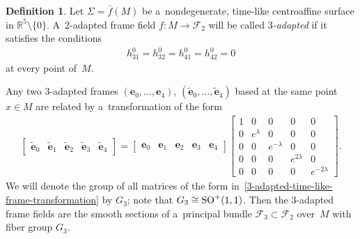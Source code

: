 \documentclass[pdftex]{sigma}
\numberwithin{equation}{section}
\theoremstyle{definition}
\newtheorem{dfn}[teo]{Definition}
\begin{document}
\begin{dfn}
Let $\Sigma = \bar{f}(M)$ be a~nondegenerate, time-like centroaf\/f\/ine surface in $\mathbb{R}^5 \setminus \{0\}$.
A~2-adapted frame f\/ield $f:M \to \mathcal{F}_2$ will be called {\em $3$-adapted} if it satisf\/ies the conditions
\begin{gather}
h^0_{31} = h^0_{32} = h^0_{41} = h^0_{42} = 0
\label{3-adapted-time-like-h}
\end{gather}
at every point of~$M$.
\end{dfn}

Any two 3-adapted frames $(\mathbf{e}_0, \ldots, \mathbf{e}_4)$, $(\tilde{\mathbf{e}}_0, \ldots, \tilde{\mathbf{e}}_4)$
based at the same point $x \in M$ are related by a~transformation of the form
\begin{gather}
\begin{bmatrix}
\tilde{\mathbf{e}}_0 & \tilde{\mathbf{e}}_1 & \tilde{\mathbf{e}}_2 & \tilde{\mathbf{e}}_3 & \tilde{\mathbf{e}}_4
\end{bmatrix}
=
\begin{bmatrix}
\mathbf{e}_0 & \mathbf{e}_1 & \mathbf{e}_2 & \mathbf{e}_3 & \mathbf{e}_4
\end{bmatrix}
\begin{bmatrix}
1 & 0 & 0 & 0 & 0
\\
0 & e^{\lambda} & 0 & 0 & 0
\\
0 & 0 & e^{-\lambda} & 0 & 0
\\
0 & 0 & 0 & e^{2\lambda} & 0
\\
0 & 0 & 0 & 0 & e^{-2\lambda}
\end{bmatrix}.
\label{3-adapted-time-like-frame-transformation}
\end{gather}
We will denote the group of all matrices of the form in~\eqref{3-adapted-time-like-frame-transformation} by $G_3$; note
that $G_3 \cong {\rm SO}^+(1,1)$.
Then the 3-adapted frame f\/ields are the smooth sections of a~principal bundle $\mathcal{F}_3 \subset \mathcal{F}_2$
over~$M$ with f\/iber group $G_3$.
\end{document}
